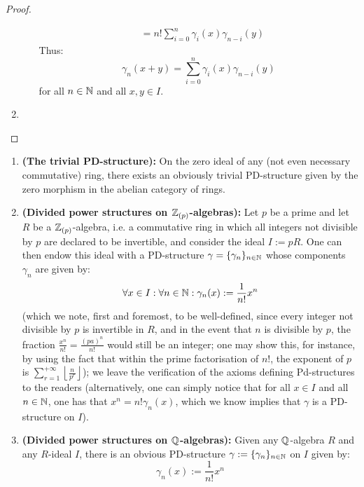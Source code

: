 \begin{proof}
\begin{enumerate}
\begin{enumerate}
$$\begin{aligned}
                                                & = n!\sum_{i=0}^n \gamma_i(x)\gamma_{n - i}(y)
                                            \end{aligned}
                                        $$
                                    Thus:
                                        $$\gamma_n(x + y) = \sum_{i=0}^n \gamma_i(x)\gamma_{n - i}(y)$$
                                    for all $n \in \mathbb{N}$ and all $x, y \in I$. 
                                \end{enumerate}
                            \item 
                        \end{enumerate}
                    \end{proof}
                    
                \begin{example}
                    \noindent
                    \begin{enumerate}
                        \item \textbf{(The trivial PD-structure):} On the zero ideal of any (not even necessary commutative) ring, there exists an obviously trivial PD-structure given by the zero morphism in the abelian category of rings. 
                        \item \textbf{(Divided power structures on $\mathbb{Z}_{(p)}$-algebras):} Let $p$ be a prime and let $R$ be a $\mathbb{Z}_{(p)}$-algebra, i.e. a commutative ring in which all integers not divisible by $p$ are declared to be invertible, and consider the ideal $I := pR$. One can then endow this ideal with a PD-structure $\gamma = \{\gamma_n\}_{n \in \mathbb{N}}$ whose components $\gamma_n$ are given by:
                            $$\forall x \in I: \forall n \in \mathbb{N}: \gamma_n(x) := \frac{1}{n!}x^n$$
                        (which we note, first and foremost, to be well-defined, since every integer not divisible by $p$ is invertible in $R$, and in the event that $n$ is divisible by $p$, the fraction $\frac{x^n}{n!} = \frac{(pa)^n}{n!}$ would still be an integer; one may show this, for instance, by using the fact that within the prime factorisation of $n!$, the exponent of $p$ is $\sum_{r=1}^{+\infty} \left\lfloor \frac{n}{p^r} \right\rfloor$); we leave the verification of the axioms defining Pd-structures to the readers (alternatively, one can simply notice that for all $x \in I$ and all $n \in \mathbb{N}$, one has that $x^n = n!\gamma_n(x)$, which we know implies that $\gamma$ is a PD-structure on $I$).
                        \item \textbf{(Divided power structures on $\mathbb{Q}$-algebras):} Given any $\mathbb{Q}$-algebra $R$ and any $R$-ideal $I$, there is an obvious PD-structure $\gamma := \{\gamma_n\}_{n \in \mathbb{N}}$ on $I$ given by:
                            $$\gamma_n(x) := \frac{1}{n!} x^n$$
                    \end{enumerate}
                \end{example}
                
